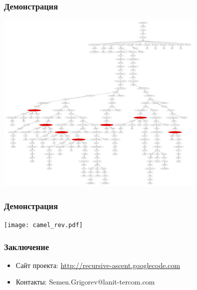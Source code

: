 \documentclass{beamer}
\begin{document}
\begin{frame}
	\transwipe[direction=90]
	\frametitle{Демонстрация}
        \begin{center}
            {\includegraphics[width=10cm]{demo/demo_picts/ast.pdf}}
        \end{center}
\end{frame}

\begin{frame}
	\transwipe[direction=90]
	\frametitle{Демонстрация}
        \begin{center}
            {\texttt{[image: camel\_rev.pdf]}}
        \end{center}

\end{frame}



\begin{frame}
	\transwipe[direction=90]
	\frametitle{Заключение}
	\begin{itemize}
        \item Сайт проекта: \href{http://recursive-ascent.googlecode.com} {http://recursive-ascent.googlecode.com}
	    \item Контакты: Semen.Grigorev@lanit-tercom.com
    \end{itemize}    
\end{frame} 
\end{document}
